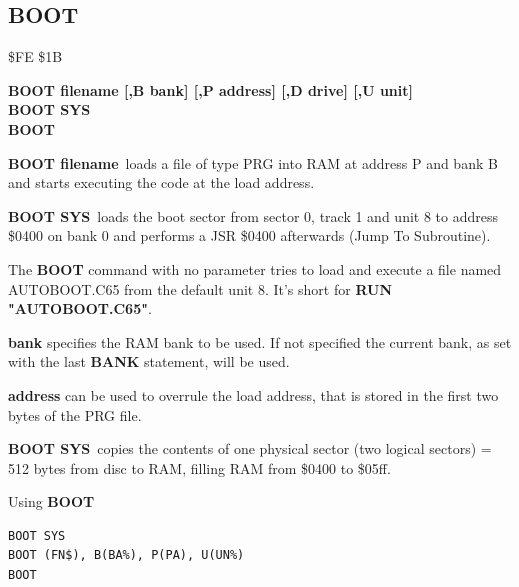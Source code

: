 \subsection{BOOT}
\begin{description}[leftmargin=2cm,style=nextline]
\item [Token:] \$FE \$1B
\item [Format:] {\bf BOOT filename [,B bank]
                [,P address]  [,D drive] [,U unit] } \\
                {\bf BOOT SYS} \\
                {\bf BOOT} 
\item [Usage:]
   {\bf BOOT filename} loads a file of type
   PRG into RAM at address P and bank B and starts executing
   the code at the load address.

   {\bf BOOT SYS} loads the boot sector from sector 0,
   track 1 and unit 8 to address \$0400 on bank 0 and
   performs a JSR \$0400 afterwards (Jump To Subroutine).

   The {\bf BOOT} command with no parameter tries to load
   and execute a file named AUTOBOOT.C65 from the default unit 8.
   It's short for {\bf RUN "AUTOBOOT.C65"}.

   \filenamedefinition

   {\bf bank} specifies the RAM bank to be used.
   If not specified the current bank, as set with the last
   {\bf BANK} statement, will be used.

   {\bf address} can be used to overrule the load address,
   that is stored in the first two bytes of the PRG file.

   \drivedefinition

   \unitdefinition

\item [Remarks:]
   {\bf BOOT SYS} copies the contents of one physical sector
   (two logical sectors) = 512 bytes from disc to RAM,
   filling RAM from \$0400 to \$05ff.

\item [Example:] Using {\bf BOOT}
\begin{tcolorbox}[colback=black,coltext=white]
\verbatimfont{\codefont}
\begin{verbatim}
BOOT SYS
BOOT (FN$), B(BA%), P(PA), U(UN%)
BOOT
\end{verbatim}
\end{tcolorbox}
\end{description}


